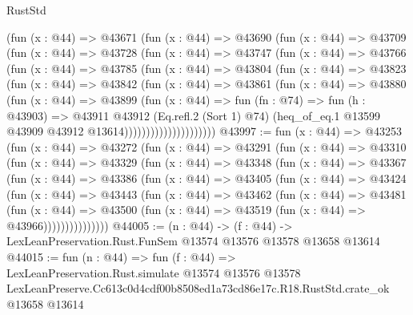 \begin{lexlean}{RustStd}
\begin{coremodule}
                (fun (x : @44) =>
                @43671
                  (fun (x : @44) =>
                  @43690
                    (fun (x : @44) =>
                    @43709
                      (fun (x : @44) =>
                      @43728
                        (fun (x : @44) =>
                        @43747
                          (fun (x : @44) =>
                          @43766
                            (fun (x : @44) =>
                            @43785
                              (fun (x : @44) =>
                              @43804
                                (fun (x : @44) =>
                                @43823
                                  (fun (x : @44) =>
                                  @43842
                                    (fun (x : @44) =>
                                    @43861
                                      (fun (x : @44) =>
                                      @43880
                                        (fun (x : @44) =>
                                        @43899
                                          (fun (x : @44) =>
                                          fun (fn : @74) =>
                                          fun (h : @43903) =>
                                          @43911
                                            @43912
                                            (Eq.refl.{2} (Sort 1) @74)
                                            (heq_of_eq.{1}
                                              @13599
                                              @43909
                                              @43912
                                              @13614)))))))))))))))))))))
@43997 := fun (x : @44) =>
  @43253
    (fun (x : @44) =>
    @43272
      (fun (x : @44) =>
      @43291
        (fun (x : @44) =>
        @43310
          (fun (x : @44) =>
          @43329
            (fun (x : @44) =>
            @43348
              (fun (x : @44) =>
              @43367
                (fun (x : @44) =>
                @43386
                  (fun (x : @44) =>
                  @43405
                    (fun (x : @44) =>
                    @43424
                      (fun (x : @44) =>
                      @43443
                        (fun (x : @44) =>
                        @43462
                          (fun (x : @44) =>
                          @43481
                            (fun (x : @44) =>
                            @43500 (fun (x : @44) => @43519 (fun (x : @44) => @43966)))))))))))))))
@44005 := (n : @44) ->
  (f : @44) -> LexLeanPreservation.Rust.FunSem @13574 @13576 @13578 @13658 @13614
@44015 := fun (n : @44) =>
  fun (f : @44) =>
  LexLeanPreservation.Rust.simulate
    @13574
    @13576
    @13578
    LexLeanPreserve.Cc613c0d4cdf00b8508ed1a73cd86e17c.R18.RustStd.crate_ok
    @13658
    @13614
\end{coremodule}
\end{lexlean}
